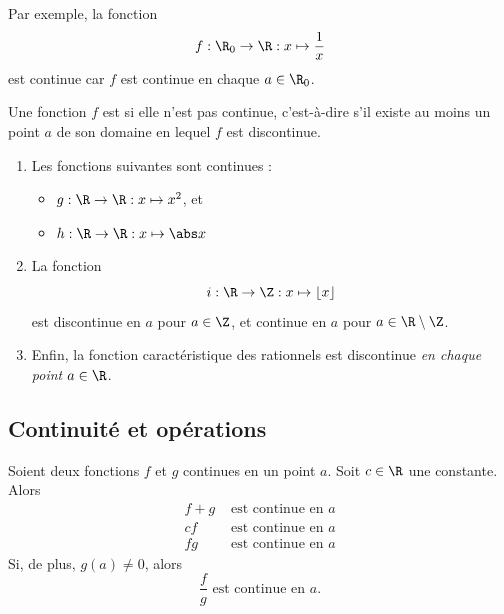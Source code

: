 \begin{frame}
\begin{example}
  Par exemple, la fonction
  \begin{equation*}
    f : \R_0 \to \R : x \mapsto \frac{1}{x}
  \end{equation*}
  est continue car $f$ est continue en chaque $a \in \R_0$.
\end{example}

\begin{definition}
Une fonction $f$ est  si elle n'est pas continue, c'est-à-dire s'il existe au moins un point \(a\) de son domaine en lequel $f$ est discontinue.
\end{definition}
\end{frame}
\begin{frame}
  \begin{example}
    \begin{enumerate}[<+->]
    \item Les fonctions suivantes sont continues :
      \begin{itemize}
      \item $g : \R \to \R : x \mapsto x^2$, et
      \item $h : \R \to \R : x \mapsto \abs x$
      \end{itemize}
    \item La fonction
      \begin{equation*}
        i : \R \to \Z : x \mapsto \lfloor x \rfloor
      \end{equation*}
      est discontinue en $a$ pour $a \in \Z$, et continue en $a$ pour $a \in \R \setminus \Z$.

    \item Enfin, la fonction caractéristique des rationnels est discontinue \emph{en chaque point $a \in \R$}.
    \end{enumerate}
  \end{example}
\end{frame}

\subsection{Continuité et opérations}
\begin{frame}
Soient deux fonctions $f$ et $g$ continues en un point \(a\). Soit $c \in \R$ une constante. Alors
\begin{align*}
  f+g &\mbox{ est continue en } a\\
  cf &\mbox{ est continue en } a\\
  f g &\mbox{ est continue en } a
\end{align*}
Si, de plus, $g(a) \neq 0$, alors
\begin{equation*}
\frac{f}{g} \mbox{ est continue en } a.
\end{equation*}
\end{frame}

